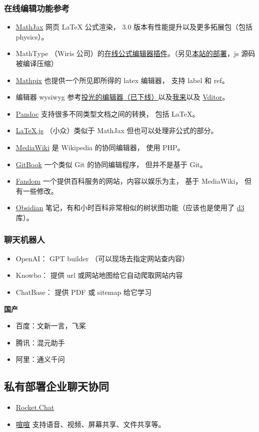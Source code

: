 \subsubsection{在线编辑功能参考}
\begin{itemize}
\item \href{https://www.mathjax.org}{MathJax} 网页 LaTeX 公式渲染， 3.0 版本有性能提升以及更多拓展包（包括 physics）。
\item MathType （Wiris 公司）的\href{https://demo.wiris.com/mathtype/en/developers.php}{在线公式编辑器插件}。（另见\href{https://wuli.wiki/apps/mathtype.html}{本站的部署}，js 源码被编译压缩）
\item \href{https://mathpix.com/ocr?gclid=CjwKCAiAy_CcBhBeEiwAcoMRHKnSPGjROmFGBj5R_Ev3hke7lG7xNIzKDHv5FgkMFq62aXRpISt_LhoC47YQAvD_BwE}{Mathpix} 也提供一个所见即所得的 latex 编辑器， 支持 label 和 ref。
\item 编辑器 wysiwyg 参考\href{https://editoe.com}{投光的编辑器（已下线）}以及\href{https://www.wolai.com}{我来}以及 \href{https://github.com/Vanessa219/vditor}{Vditor}。
\item \href{https://pandoc.org/}{Pandoc} 支持很多不同类型文档之间的转换， 包括 LaTeX。
\item \href{https://github.com/michael-brade/LaTeX.js}{LaTeX.js} （小众）类似于 MathJax 但也可以处理非公式的部分。
\item \href{https://www.mediawiki.org/wiki/MediaWiki}{MediaWiki} 是 Wikipedia 的协同编辑器， 使用 PHP。
\item \href{https://www.gitbook.com/}{GitBook} 一个类似 Git 的协同编辑程序， 但并不是基于 Git。
\item \href{https://www.fandom.com/}{Fandom} 一个提供百科服务的网站，内容以娱乐为主， 基于 MediaWiki， 但有一些修改。
\item \href{https://obsidian.md/}{Obsidian} 笔记，有和小时百科非常相似的树状图功能（应该也是使用了 \href{https://d3js.org/}{d3} 库）。
\end{itemize}

\subsubsection{聊天机器人}
\begin{itemize}
\item OpenAI： GPT builder （可以现场去指定网站查内容）
\item Knowbo： 提供 url 或网站地图给它自动爬取网站内容
\item ChatBase： 提供 PDF 或 sitemap 给它学习
\end{itemize}

\textbf{国产}
\begin{itemize}
\item 百度：文新一言，飞桨
\item 腾讯：混元助手
\item 阿里：通义千问
\end{itemize}

\subsection{私有部署企业聊天协同}
\begin{itemize}
\item \href{https://www.rocket.chat/}{Rocket.Chat}
\item \href{https://xuanim.com/}{喧喧} 支持语音、视频、屏幕共享、文件共享等。
\end{itemize}

